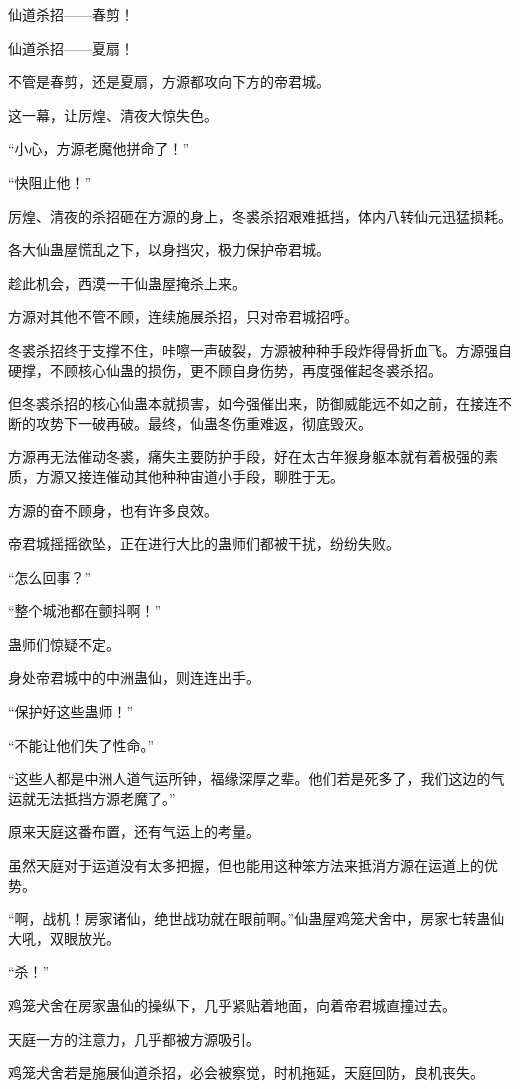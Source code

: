 \begin{this_body}
仙道杀招——春剪！

仙道杀招——夏扇！

不管是春剪，还是夏扇，方源都攻向下方的帝君城。

这一幕，让厉煌、清夜大惊失色。

“小心，方源老魔他拼命了！”

“快阻止他！”

厉煌、清夜的杀招砸在方源的身上，冬裘杀招艰难抵挡，体内八转仙元迅猛损耗。

各大仙蛊屋慌乱之下，以身挡灾，极力保护帝君城。

趁此机会，西漠一干仙蛊屋掩杀上来。

方源对其他不管不顾，连续施展杀招，只对帝君城招呼。

冬裘杀招终于支撑不住，咔嚓一声破裂，方源被种种手段炸得骨折血飞。方源强自硬撑，不顾核心仙蛊的损伤，更不顾自身伤势，再度强催起冬裘杀招。

但冬裘杀招的核心仙蛊本就损害，如今强催出来，防御威能远不如之前，在接连不断的攻势下一破再破。最终，仙蛊冬伤重难返，彻底毁灭。

方源再无法催动冬裘，痛失主要防护手段，好在太古年猴身躯本就有着极强的素质，方源又接连催动其他种种宙道小手段，聊胜于无。

方源的奋不顾身，也有许多良效。

帝君城摇摇欲坠，正在进行大比的蛊师们都被干扰，纷纷失败。

“怎么回事？”

“整个城池都在颤抖啊！”

蛊师们惊疑不定。

身处帝君城中的中洲蛊仙，则连连出手。

“保护好这些蛊师！”

“不能让他们失了性命。”

“这些人都是中洲人道气运所钟，福缘深厚之辈。他们若是死多了，我们这边的气运就无法抵挡方源老魔了。”

原来天庭这番布置，还有气运上的考量。

虽然天庭对于运道没有太多把握，但也能用这种笨方法来抵消方源在运道上的优势。

“啊，战机！房家诸仙，绝世战功就在眼前啊。”仙蛊屋鸡笼犬舍中，房家七转蛊仙大吼，双眼放光。

“杀！”

鸡笼犬舍在房家蛊仙的操纵下，几乎紧贴着地面，向着帝君城直撞过去。

天庭一方的注意力，几乎都被方源吸引。

鸡笼犬舍若是施展仙道杀招，必会被察觉，时机拖延，天庭回防，良机丧失。


\end{this_body}
